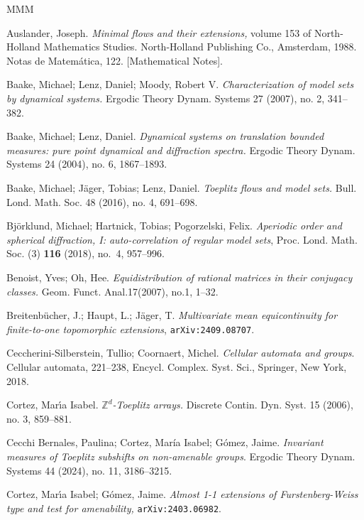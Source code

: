 \documentclass[titlepage,reqno,10pt]{amsart}
\theoremstyle{definition}
\def\Z{{\mathbb Z}}
\begin{document}
\begin{thebibliography}{MMM}

Auslander, Joseph.
\textit{Minimal flows and their extensions,} volume 153 of North-Holland Mathematics
Studies. North-Holland Publishing Co., Amsterdam, 1988. Notas de Matemática, 122. [Mathematical Notes]. 



 Baake, Michael; Lenz, Daniel; Moody, Robert V.  {\it Characterization of model sets by dynamical systems.} Ergodic Theory Dynam. Systems 27 (2007), no. 2, 341--382.

 Baake, Michael; Lenz, Daniel. {\it Dynamical systems on translation bounded measures: pure point dynamical and diffraction spectra.}  Ergodic Theory Dynam. Systems 24 (2004), no. 6, 1867--1893.

 Baake, Michael; J\"ager, Tobias;  Lenz, Daniel. {\it Toeplitz flows and model sets.} 
Bull. Lond. Math. Soc. 48 (2016), no. 4, 691--698.

 Bj\"orklund, Michael; Hartnick, Tobias;  Pogorzelski, Felix. \textit{Aperiodic order and spherical diffraction, I: auto-correlation of regular model sets}, Proc. Lond. Math. Soc. (3) {\bf 116} (2018), no.~4, 957--996.

Benoist, Yves; Oh, Hee.
\textit{Equidistribution of rational matrices in their conjugacy classes.}
Geom. Funct. Anal.17(2007), no.1, 1–32.

 Breitenb{\"u}cher, J.;  Haupt, L.;   J{\"a}ger, T. \textit{Multivariate mean equicontinuity for finite-to-one topomorphic extensions}, {\tt arXiv:2409.08707}.

 Ceccherini-Silberstein, Tullio; Coornaert, Michel. \textit{Cellular automata and groups}. Cellular automata, 221--238, Encycl. Complex. Syst. Sci., Springer, New York, 2018.

 Cortez, Mar\'{\i}a  Isabel. \textit{$\Z^d$-{T}oeplitz arrays.} Discrete Contin. Dyn. Syst. 15 (2006), no. 3, 859--881.

 Cecchi Bernales, Paulina; Cortez, María Isabel; Gómez, Jaime.  \textit{Invariant measures of Toeplitz subshifts on non-amenable groups}. Ergodic Theory Dynam. Systems 44 (2024), no. 11, 3186--3215.

   Cortez, Mar\'{\i}a  Isabel;  G\'omez, Jaime.  \textit{Almost 1-1 extensions of Furstenberg-Weiss type and  test for amenability,}  {\tt arXiv:2403.06982}.


\end{thebibliography}
\end{document}
